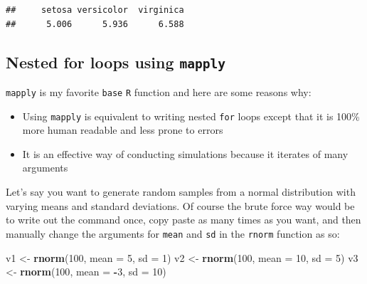 \documentclass[]{book}
\makeatletter
\newenvironment{Shaded}{\begin{snugshade}}{\end{snugshade}}
\newcommand{\KeywordTok}[1]{\textcolor[rgb]{0.13,0.29,0.53}{\textbf{#1}}}
\newcommand{\DataTypeTok}[1]{\textcolor[rgb]{0.13,0.29,0.53}{#1}}
\newcommand{\DecValTok}[1]{\textcolor[rgb]{0.00,0.00,0.81}{#1}}
\newcommand{\StringTok}[1]{\textcolor[rgb]{0.31,0.60,0.02}{#1}}
\newcommand{\CommentTok}[1]{\textcolor[rgb]{0.56,0.35,0.01}{\textit{#1}}}
\newcommand{\OperatorTok}[1]{\textcolor[rgb]{0.81,0.36,0.00}{\textbf{#1}}}
\newcommand{\NormalTok}[1]{#1}
\providecommand{\tightlist}{%
  \setlength{\itemsep}{0pt}\setlength{\parskip}{0pt}}
\newenvironment{kframe}{%
\medskip{}
\setlength{\fboxsep}{.8em}
 \def\at@end@of@kframe{}%
 \ifinner\ifhmode%
  \def\at@end@of@kframe{\end{minipage}}%
  \begin{minipage}{\columnwidth}%
 \fi\fi%
 \def\FrameCommand##1{\hskip\@totalleftmargin \hskip-\fboxsep
 \colorbox{shadecolor}{##1}\hskip-\fboxsep
     \hskip-\linewidth \hskip-\@totalleftmargin \hskip\columnwidth}%
 \MakeFramed {\advance\hsize-\width
   \@totalleftmargin\z@ \linewidth\hsize
   \@setminipage}}%
 {\par\unskip\endMakeFramed%
 \at@end@of@kframe}
\renewenvironment{Shaded}{\begin{kframe}}{\end{kframe}}
\theoremstyle{definition}
\theoremstyle{definition}
\theoremstyle{definition}
\theoremstyle{remark}
\makeatother
\begin{document}
\begin{Shaded}
\end{Shaded}

\begin{verbatim}
##     setosa versicolor  virginica 
##      5.006      5.936      6.588
\end{verbatim}

\subsection{\texorpdfstring{Nested for loops using
\texttt{mapply}}{Nested for loops using mapply}}\label{nested-for-loops-using-mapply}

\texttt{mapply} is my favorite \texttt{base} \texttt{R} function and
here are some reasons why:

\begin{itemize}
\tightlist
\item
  Using \texttt{mapply} is equivalent to writing nested \texttt{for}
  loops except that it is 100\% more human readable and less prone to
  errors
\item
  It is an effective way of conducting simulations because it iterates
  of many arguments
\end{itemize}

Let's say you want to generate random samples from a normal distribution
with varying means and standard deviations. Of course the brute force
way would be to write out the command once, copy paste as many times as
you want, and then manually change the arguments for \texttt{mean} and
\texttt{sd} in the \texttt{rnorm} function as so:

\begin{Shaded}
\begin{Highlighting}[]
\NormalTok{v1 <-}\StringTok{ }\KeywordTok{rnorm}\NormalTok{(}\DecValTok{100}\NormalTok{, }\DataTypeTok{mean =} \DecValTok{5}\NormalTok{, }\DataTypeTok{sd =} \DecValTok{1}\NormalTok{)}
\NormalTok{v2 <-}\StringTok{ }\KeywordTok{rnorm}\NormalTok{(}\DecValTok{100}\NormalTok{, }\DataTypeTok{mean =} \DecValTok{10}\NormalTok{, }\DataTypeTok{sd =} \DecValTok{5}\NormalTok{)}
\NormalTok{v3 <-}\StringTok{ }\KeywordTok{rnorm}\NormalTok{(}\DecValTok{100}\NormalTok{, }\DataTypeTok{mean =} \OperatorTok{-}\DecValTok{3}\NormalTok{, }\DataTypeTok{sd =} \DecValTok{10}\NormalTok{)}
\end{Highlighting}
\end{Shaded}
\end{document}
